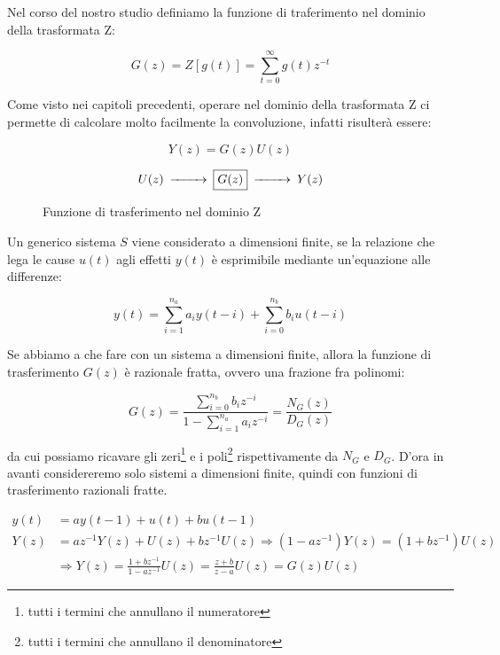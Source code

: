 Nel corso del nostro studio definiamo la funzione di traferimento nel dominio della trasformata Z:

  \[ G(z)=Z[g(t)]=\sum_{t=0}^{\infty}{g(t)z^{-t}} \]

Come visto nei capitoli precedenti, operare nel dominio della trasformata Z ci permette di calcolare molto facilmente la convoluzione, infatti risulterà essere:

  \[ Y(z)=G(z)U(z)\]


  \begin{figure}[htbp]\Large
    \centering
    \[
      \begin{CD}
        U(z) @>>> \framebox{$G(z)$} @>>> Y(z)
      \end{CD}
    \]
    \caption{Funzione di trasferimento nel dominio Z \label{fig:funztrasfz}}
  \end{figure}
  

Un generico sistema $S$ viene considerato a dimensioni finite, se la relazione che lega le cause $u(t)$ agli effetti $y(t)$ è esprimibile mediante un'equazione alle differenze:

  \[ y(t)=\sum_{i=1}^{n_a} {a_iy(t-i)}+\sum_{i=0}^{n_b} {b_iu(t-i)} \]
  
Se abbiamo a che fare con un sistema a dimensioni finite, allora la funzione di trasferimento $G(z)$ è razionale fratta, ovvero una frazione fra polinomi:

  \[ G(z)=\frac{\sum_{i=0}^{n_b} {b_iz^{-i}}}{1-\sum_{i=1}^{n_a} {a_iz^{-i}}}=\frac{N_G(z)}{D_G(z)} \]

da cui possiamo ricavare gli zeri\footnote{tutti i termini che annullano il numeratore} e i poli\footnote{tutti i termini che annullano il denominatore} rispettivamente da $N_G$ e $D_G$. D'ora in avanti considereremo solo sistemi a dimensioni finite, quindi con funzioni di trasferimento razionali fratte.

\begin{esempio}
  \begin{align*}
    y(t)&=ay(t-1)+u(t)+bu(t-1)\\
    Y(z)&=az^{-1}Y(z)+U(z)+bz^{-1}U(z) \Longrightarrow (1-az^{-1})Y(z)=(1+bz^{-1})U(z) \\
    &\Longrightarrow Y(z)=\frac{1+bz^{-1}}{1-az^{-1}}U(z)=\frac{z+b}{z-a}U(z)=G(z)U(z)
  \end{align*}
\end{esempio}

